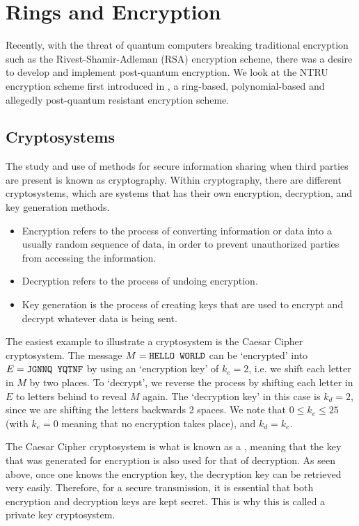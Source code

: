 \chapter{Rings and Encryption}
Recently, with the threat of quantum computers breaking traditional encryption such as the Rivest-Shamir-Adleman (RSA) encryption scheme, there was a desire to develop and implement post-quantum encryption. We look at the NTRU encryption scheme first introduced in \cite{hoffstein_pipher_silverman_1996}, a ring-based, polynomial-based and allegedly post-quantum resistant encryption scheme.

\section{Cryptosystems}
The study and use of methods for secure information sharing when third parties are present is known as cryptography. Within cryptography, there are different cryptosystems, which are systems that has their own encryption, decryption, and key generation methods.
\begin{itemize}
    \item Encryption refers to the process of converting information or data into a usually random sequence of data, in order to prevent unauthorized parties from accessing the information.
    \item Decryption refers to the process of undoing encryption.
    \item Key generation is the process of creating keys that are used to encrypt and decrypt whatever data is being sent.
\end{itemize}

\begin{example}
    The easiest example to illustrate a cryptosystem is the Caesar Cipher cryptosystem. The message $M = \texttt{HELLO WORLD}$ can be `encrypted' into $E = \texttt{JGNNQ YQTNF}$ by using an `encryption key' of $k_e = 2$, i.e. we shift each letter in $M$ by two places. To `decrypt', we reverse the process by shifting each letter in $E$ to letters behind to reveal $M$ again. The `decryption key' in this case is $k_d = 2$, since we are shifting the letters backwards 2 spaces. We note that $0 \leq k_e \leq 25$ (with $k_e = 0$ meaning that no encryption takes place), and $k_d = k_e$.
\end{example}

The Caesar Cipher cryptosystem is what is known as a , meaning that the key that was generated for encryption is also used for that of decryption. As seen above, once one knows the encryption key, the decryption key can be retrieved very easily. Therefore, for a secure transmission, it is essential that both encryption and decryption keys are kept secret. This is why this is called a private key cryptosystem.

